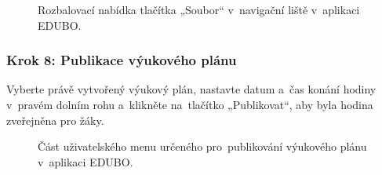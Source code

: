 \documentclass[male,czech,api_bc]{kitheses}
\begin{document}
\begin{figure}[H]
	\centering
	\caption{Rozbalovací nabídka tlačítka „Soubor“ v~navigační liště v~aplikaci EDUBO.}
	\label{fig:manual-3}
\end{figure}

\subsubsection{Krok 8: Publikace výukového plánu}
Vyberte právě vytvořený výukový plán, nastavte datum a~čas konání hodiny v~pravém dolním rohu a~klikněte na~tlačítko „Publikovat“, aby byla hodina zveřejněna pro žáky.

\begin{figure}[H]
	\centering
	\caption{Část uživatelského menu určeného pro~publikování výukového plánu v~aplikaci EDUBO.}
	\label{fig:manual-4}
\end{figure}
\end{document}
